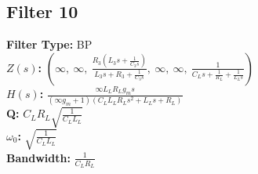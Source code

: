 \documentclass{article}
\begin{document}
\subsection*{Filter 10}
\textbf{Filter Type:} BP \\ 
\textbf{$Z(s)$:} $\left( \infty, \  \infty, \  \frac{R_{3} \left(L_{3} s + \frac{1}{C_{3} s}\right)}{L_{3} s + R_{3} + \frac{1}{C_{3} s}}, \  \infty, \  \infty, \  \frac{1}{C_{L} s + \frac{1}{R_{L}} + \frac{1}{L_{L} s}}\right)$ \\ 
\textbf{$H(s)$:} $\frac{\infty L_{L} R_{L} g_{m} s}{\left(\infty g_{m} + 1\right) \left(C_{L} L_{L} R_{L} s^{2} + L_{L} s + R_{L}\right)}$ \\ 
\textbf{Q:} $C_{L} R_{L} \sqrt{\frac{1}{C_{L} L_{L}}}$ \\ 
\textbf{$\omega_0$:} $\sqrt{\frac{1}{C_{L} L_{L}}}$ \\ 
\textbf{Bandwidth:} $\frac{1}{C_{L} R_{L}}$ \\ 
\end{document}
